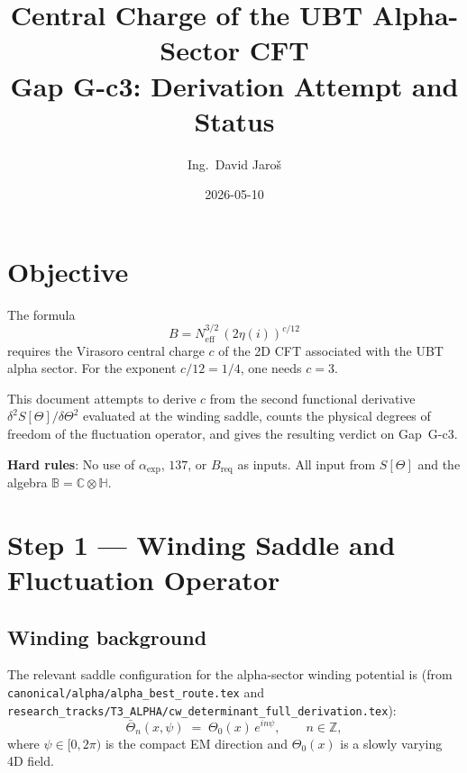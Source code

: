 \documentclass[12pt,a4paper]{article}
\title{\textbf{Central Charge of the UBT Alpha-Sector CFT}\\[4pt]
         \large Gap G-c3: Derivation Attempt and Status}
\author{Ing.\ David Jaro\v{s}}
\date{2026-05-10}
\theoremstyle{remark}
\newcommand{\BB}{\mathbb{B}}
\newcommand{\CC}{\mathbb{C}}
\newcommand{\HH}{\mathbb{H}}
\newcommand{\ZZ}{\mathbb{Z}}
\begin{document}
  \maketitle
\fi

\section{Objective}
\label{sec:goal}

The formula
\begin{equation}
  B = N_{\mathrm{eff}}^{3/2}\,(2\eta(i))^{c/12}
  \label{eq:B_formula}
\end{equation}
requires the Virasoro central charge $c$ of the 2D CFT associated with the
UBT alpha sector.  For the exponent $c/12 = 1/4$, one needs $c = 3$.

This document attempts to derive $c$ from the second functional derivative
$\delta^2 S[\Theta]/\delta\Theta^2$ evaluated at the winding saddle, counts the
physical degrees of freedom of the fluctuation operator, and gives the
resulting verdict on Gap~G-c3.

\textbf{Hard rules}: No use of $\alpha_{\exp}$, $137$, or $B_{\mathrm{req}}$
as inputs.  All input from $S[\Theta]$ and the algebra $\BB = \CC\otimes\HH$.

\section{Step 1 — Winding Saddle and Fluctuation Operator}
\label{sec:saddle}

\subsection{Winding background}

The relevant saddle configuration for the alpha-sector winding potential is
(from \texttt{canonical/alpha/alpha\_best\_route.tex} and
\texttt{research\_tracks/T3\_ALPHA/cw\_determinant\_full\_derivation.tex}):
\begin{equation}
  \bar\Theta_n(x,\psi) \;=\; \Theta_0(x)\,e^{in\psi},
  \qquad n \in \ZZ,
  \label{eq:winding_saddle}
\end{equation}
where $\psi \in [0,2\pi)$ is the compact EM direction and $\Theta_0(x)$ is a
slowly varying 4D field.
\end{document}
